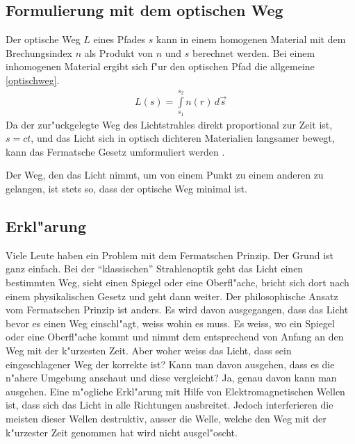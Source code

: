 \subsection{Formulierung mit dem optischen Weg}
Der optische Weg $L$  eines Pfades $s$ kann in einem homogenen Material 
mit dem Brechungsindex $n$ als Produkt von $n$ und $s$ berechnet werden.
Bei einem inhomogenen Material ergibt sich f"ur den optischen Pfad die
allgemeine \eqref{optischweg}.
\begin{align}
	L(s) = \int\limits_{s_1}^{s_2} n(r) \,d\vec s 
	\label{optischweg}
\end{align}
Da der zur"uckgelegte Weg des Lichtstrahles direkt proportional zur Zeit
ist, $s = c t$,
und das Licht sich in optisch dichteren Materialien langsamer bewegt,
kann das Fermatsche Gesetz umformuliert werden \cite{DefinitionFermat}. 
\begin{postulat}
Der Weg, den das Licht nimmt, um von einem Punkt zu einem anderen zu
gelangen, ist stets so, dass der optische Weg minimal ist.
\end{postulat}
\subsection{Erkl"arung}
Viele Leute haben ein Problem mit dem Fermatschen Prinzip. 
Der Grund ist ganz einfach. 
Bei der ``klassischen'' Strahlenoptik geht das Licht einen bestimmten Weg, 
sieht einen Spiegel oder eine Oberfl"ache, bricht sich dort nach einem 
physikalischen Gesetz und geht dann weiter.
Der philosophische Ansatz vom Fermatschen Prinzip ist anders. 
Es wird davon ausgegangen, dass das Licht bevor es einen Weg einschl"agt, 
weiss wohin es muss. Es weiss, wo ein Spiegel oder eine Oberfl"ache kommt und 
nimmt dem entsprechend von Anfang an den Weg mit der k"urzesten Zeit.
Aber woher weiss das Licht, dass sein eingeschlagener Weg der korrekte ist?
Kann man davon ausgehen, dass es die n"ahere Umgebung anschaut und diese vergleicht?
Ja, genau davon kann man ausgehen.
Eine m"ogliche Erkl"arung mit Hilfe von Elektromagnetischen Wellen ist,
dass sich das Licht in alle Richtungen ausbreitet. 
Jedoch interferieren die meisten dieser Wellen destruktiv, 
ausser die Welle, welche den Weg mit der k"urzester Zeit genommen hat
wird nicht ausgel"oscht.

